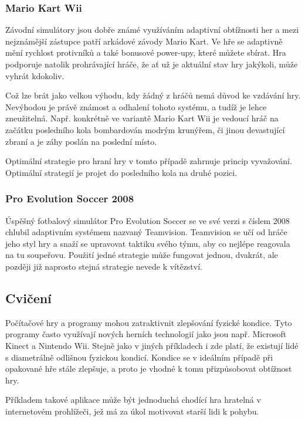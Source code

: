 \subsubsection{Mario Kart Wii}

Závodní simulátory jsou dobře známé využíváním adaptivní obtížnosti her a mezi nejznámější zástupce patří arkádové závody Mario Kart. Ve hře se adaptivně mění rychlost protivníků a také bonusové power-upy, které můžete sbírat. Hra podporuje natolik prohrávající hráče, že ať už je aktuální stav hry jakýkoli, může vyhrát kdokoliv.

Což lze brát jako velkou výhodu, kdy žádný z hráčů nemá důvod ke vzdávání hry. Nevýhodou je právě známost a odhalení tohoto systému, a tudíž je lehce zneužitelná. Např. konkrétně ve variantě Mario Kart Wii je vedoucí hráč na začátku posledního kola bombardován modrým krunýřem, či jinou devastující zbraní a je záhy poslán na poslední místo. 

Optimální strategie pro hraní hry v tomto případě zahrnuje princip vyvažování. Optimální strategií je projet do posledního kola na druhé pozici\cite{5}. 

\subsubsection{Pro Evolution Soccer 2008}

Úspěšný fotbalový simulátor Pro Evolution Soccer se ve své verzi s číslem 2008 chlubil adaptivním systémem nazvaný Teamvision. Teamvision se učí od hráče jeho styl hry a snaží se upravovat taktiku svého týmu, aby co nejlépe reagovala na tu soupeřovu. Použití jedné strategie může fungovat jednou, dvakrát, ale později již naprosto stejná strategie nevede k vítězství\cite{6}. 

\subsection{Cvičení}

Počítačové hry a programy mohou zatraktivnit zlepšování fyzické kondice. Tyto programy často využívají nových herních technologií jako jsou např. Microsoft Kinect\cite{kinect} a Nintendo Wii\cite{wii}. Stejně jako v jiných příkladech i zde platí, že existují lidé s diametrálně odlišnou fyzickou kondicí. Kondice se v ideálním případě při opakované hře stále zlepšuje, a proto je vhodné k tomu přizpůsobovat obtížnost hry.

Příkladem takové aplikace může být jednoduchá chodící hra hratelná v internetovém prohlížeči, jež má za úkol motivovat starší lidi k pohybu.

